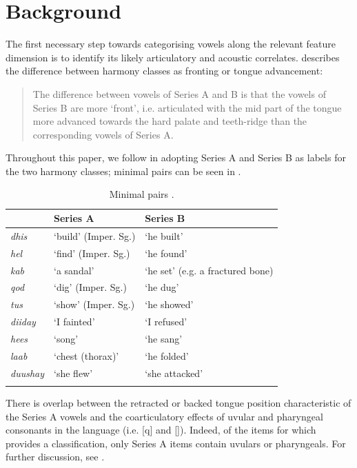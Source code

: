 \documentclass[output=paper,newtxmath,modfonts,nonflat,hidelinks]{langsci/langscibook}
\begin{document}
\section{Background}
\label{background}

The first necessary step towards categorising vowels along the relevant feature dimension is to identify its likely articulatory and acoustic correlates. \citeauthor{Andrzejewski1955} describes the difference between harmony classes as fronting or tongue advancement:

\begin{quote}
The difference between vowels of Series A and B is that the vowels of Series B are more `front', i.e. articulated with the mid part of the tongue more advanced towards the hard palate and teeth-ridge than the corresponding vowels of Series A. \citep{Andrzejewski1955}
\end{quote}

\noindent Throughout this paper, we follow \citeauthor{Andrzejewski1955} in adopting Series A and Series B as labels for the two harmony classes; minimal pairs can be seen in .

\begin{table}
\begin{tabular}{lll}
\lsptoprule
	& {Series A}	& {Series B}\\\midrule
\emph{dhis}	&`build' (Imper. Sg.)	&`he built'\\
\emph{hel}	&`find' (Imper. Sg.)	&`he found'\\
\emph{kab}	&`a sandal'				&`he set' (e.g. a fractured bone)\\
\emph{qod}	&`dig' (Imper. Sg.)		&`he dug'\\
\emph{tus}	&`show' (Imper. Sg.)	&`he showed'\\
\emph{diiday}&`I fainted'			&`I refused'\\
\emph{hees}	&`song'					&`he sang'\\
\emph{laab}	&`chest (thorax)'		&`he folded'\\
\emph{duushay}&`she flew'			&`she attacked'\\
\lspbottomrule
\end{tabular}
\caption{Minimal pairs \citep{Andrzejewski1955}.}
\label{tab:kbgy:1}
\end{table}

There is overlap between the retracted or backed tongue position characteristic of the Series A vowels and the coarticulatory effects of uvular and pharyngeal consonants in the language (i.e. [q] and []).  Indeed, of the items for which \citeauthor{Andrzejewski1955} provides a classification, only Series A items contain uvulars or pharyngeals.  For further discussion, see .
\end{document}

